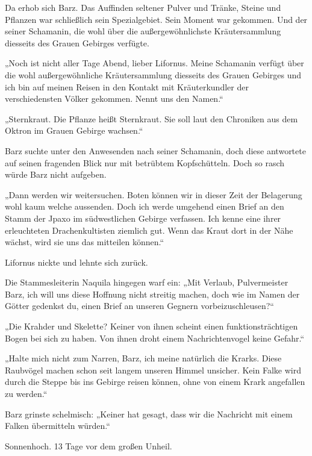 Da erhob sich Barz. Das Auffinden seltener Pulver und Tränke, Steine und Pflanzen war schließlich sein Spezialgebiet. Sein Moment war gekommen. Und der seiner Schamanin, die wohl über die außergewöhnlichste Kräutersammlung diesseits des Grauen Gebirges verfügte.

„Noch ist nicht aller Tage Abend, lieber Lifornus. Meine Schamanin verfügt über die wohl außergewöhnliche Kräutersammlung diesseits des Grauen Gebirges und ich bin auf meinen Reisen in den Kontakt mit Kräuterkundler der verschiedensten Völker gekommen. Nennt uns den Namen.“

„Sternkraut. Die Pflanze heißt Sternkraut. Sie soll laut den Chroniken aus dem Oktron im Grauen Gebirge wachsen.“

Barz suchte unter den Anwesenden nach seiner Schamanin, doch diese antwortete auf seinen fragenden Blick nur mit betrübtem Kopfschütteln. Doch so rasch würde Barz nicht aufgeben.

„Dann werden wir weitersuchen. Boten können wir in dieser Zeit der Belagerung wohl kaum welche aussenden. Doch ich werde umgehend einen Brief an den Stamm der Jpaxo im südwestlichen Gebirge verfassen. Ich kenne eine ihrer erleuchteten Drachenkultisten ziemlich gut. Wenn das Kraut dort in der Nähe wächst, wird sie uns das mitteilen können.“

Lifornus nickte und lehnte sich zurück.

Die Stammesleiterin Naquila hingegen warf ein: „Mit Verlaub, Pulvermeister Barz, ich will uns diese Hoffnung nicht streitig machen, doch wie im Namen der Götter gedenkst du, einen Brief an unseren Gegnern vorbeizuschleusen?“

„Die Krahder und Skelette? Keiner von ihnen scheint einen funktionsträchtigen Bogen bei sich zu haben. Von ihnen droht einem Nachrichtenvogel keine Gefahr.“

„Halte mich nicht zum Narren, Barz, ich meine natürlich die Krarks. Diese Raubvögel machen schon seit langem unseren Himmel unsicher. Kein Falke wird durch die Steppe bis ins Gebirge reisen können, ohne von einem Krark angefallen zu werden.“

Barz grinste schelmisch: „Keiner hat gesagt, dass wir die Nachricht mit einem Falken übermitteln würden.“



\trennzeichen



Sonnenhoch. 13 Tage vor dem großen Unheil.\bigskip



